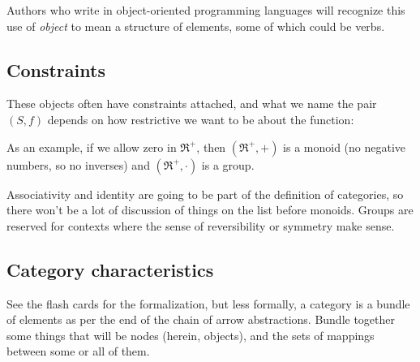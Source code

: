 \documentclass[11pt]{article}
\begin{document}

Authors who write in object-oriented programming languages will recognize this
use of {\em object} to mean a structure of elements, some of which could be verbs.

\subsection{Constraints}
These objects often have constraints attached, and what we name the pair $(S, f)$ depends on
how restrictive we want to be about the function:


As an example, if we allow zero in $\Re^+$, then $(\Re^+, +)$ is a monoid (no negative numbers, so
no inverses) and $(\Re^+, \cdot)$ is a group.

Associativity and identity are going to be part of the definition of categories,
so there won't be a lot of discussion of things on the list before monoids.
Groups are reserved for contexts where the sense of reversibility or symmetry make sense.

\subsection{Category characteristics}
See the flash cards for the formalization, but less formally,
a category is a bundle of elements as per the end of the chain of arrow abstractions. Bundle
together some things that will be nodes (herein, objects),
and the sets of mappings between some or all of them.
\end{document}

